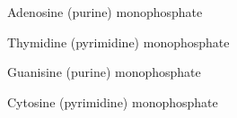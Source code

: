 \documentclass{article}
\begin{document}
Adenosine (purine) monophosphate\\[2ex]


\bigskip

Thymidine (pyrimidine) monophosphate\\[2ex]


\newpage

Guanisine (purine) monophosphate\\[2ex]


\bigskip

Cytosine (pyrimidine) monophosphate\\[2ex]

\end{document}
